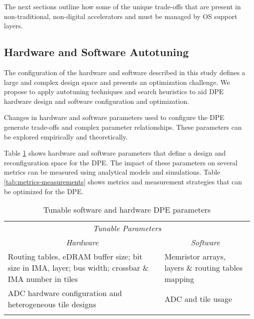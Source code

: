 The next sections outline how some of the unique trade-offs that are present in
non-traditional, non-digital accelerators and must be managed by OS support
layers.

\subsection{Hardware and Software Autotuning}\label{sec:autotuning}

The configuration of the hardware and software described in this study defines
a large and complex design space and presents an optimization challenge. We
propose to apply autotuning techniques and search heuristics to aid DPE
hardware design and software configuration and optimization.

Changes in hardware and software parameters used to configure the DPE generate
trade-offs and complex parameter relationships. These parameters can be
explored empirically and theoretically.

Table \ref{tab:hard-soft-params} shows hardware and software parameters that
define a design and reconfiguration space for the DPE. The impact of these
parameters on several metrics can be measured using analytical models and
simulations.  Table \ref{tab:metrics-measurements} shows metrics and
measurement strategies that can be optimized for the DPE.

\begin{table}[htpb]
\centering
\begin{tabular}{@{}p{}p{}@{}}
\toprule
\multicolumn{2}{c}{\textit{Tunable Parameters}} \\
\multicolumn{1}{c}{\textit{Hardware}} & \multicolumn{1}{c}{\textit{Software}} \\
Routing tables, eDRAM buffer size; bit size in IMA, layer; bus width; crossbar \& IMA number in tiles & Memristor arrays, layers \& routing tables mapping  \\
\addlinespace
ADC hardware configuration and heterogeneous tile designs & ADC and tile usage \\ \bottomrule
\addlinespace
\end{tabular}
\caption{Tunable software and hardware DPE parameters
}
\label{tab:hard-soft-params}
\end{table}

